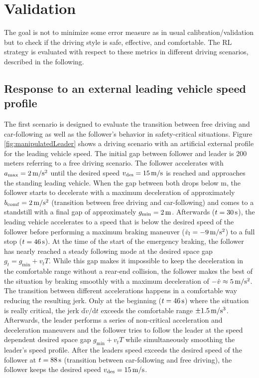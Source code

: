 \documentclass[review]{elsarticle}
\providecommand{\sub}[1]{_{\mathrm{#1}}}  %
\providecommand{\3}{{\ss}}
\begin{document}
	
	
	
	
	
	
	
	\section{Validation}
	\label{sec:validation}
	The goal is not to minimize some error measure as in usual calibration\slash validation but to check if the driving style is safe,
	effective, and comfortable. The RL strategy is evaluated with respect to these metrics in different driving scenarios, described in the following.
	
	\subsection{Response to an external leading vehicle speed profile}
	The first scenario is designed to evaluate the transition between free driving and car-following as well as the follower's behavior in safety-critical situations. 
	Figure \ref{fig:manipulatedLeader} shows a driving scenario with an
	artificial external profile for the leading vehicle speed. The initial
	gap between 
	follower and leader is 200 meters referring to a free driving
	scenario. The follower accelerates with $a\sub{max} = \unit[2]{m/s^2}$ until
	the desired speed $v\sub{des} = \unit[15]{m/s} $ is reached and approaches
	the standing leading vehicle. When the gap between both drops below 
	\unit[70]{m},
	the follower starts to decelerate with a maximum
	deceleration of approximately $b_{\rm
		comf} = \unit[2]{m/s^2}$ (transition between free driving and car-following)
	and comes to a standstill with a final gap of approximately 
	$g\sub{min} = \unit[2]{m}$. Afterwards ($t=\unit[30]{s}$),  the leading vehicle accelerates to a speed
	that is below the desired speed of the follower before performing a
	maximum braking maneuver ($\dot{v}_l=\unit[-9]{m/s^2}$) to a full stop ($t=\unit[46]{s}$). At the time of the start of the
	emergency braking, the follower has nearly reached a steady
	following mode at the desired space gap $g_t=g\sub{min}+v_{t} T$. While this
	gap makes it impossible to keep the deceleration in the comfortable
	range without a rear-end collision, the follower makes the best of
	the situation by braking smoothly with a maximum deceleration of $-\dot{v}
	\approx \unit[5]{m/s^2}$.  The transition between different
	accelerations happens in a comfortable way reducing the resulting
	jerk. Only at the beginning ($t=\unit[46]{s}$) where the situation is
	really critical, the jerk $\text{d}\dot{v}/\text{d}t$ exceeds the comfortable range 
	$\pm \unit[1.5]{m/s^3}$. Afterwards, the leader performs a series of
	non-critical acceleration and deceleration maneuvers and the follower
	tries to follow the leader at the speed dependent desired space gap
	$g\sub{min}+v_{t}T$ while simultaneously smoothing the leader's speed profile. After the leaders speed exceeds the desired speed of the follower at $t=\unit[88]{s}$ (transition between car-following and free driving), the follower keeps the desired speed $v\sub{des} = \unit[15]{m/s} $.
	
\end{document}
